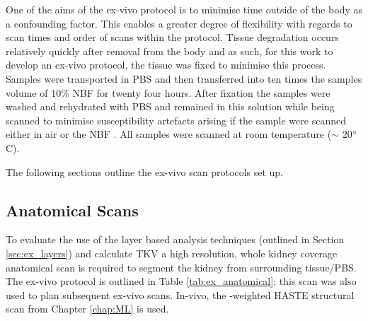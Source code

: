 One of the aims of the ex-vivo protocol is to minimise time outside of the body as a confounding factor. This enables a greater degree of flexibility with regards to scan times and order of scans within the protocol. Tissue degradation occurs relatively quickly after removal from the body and as such, for this work to develop an ex-vivo protocol, the tissue was fixed to minimise this process. Samples were transported in \acf{PBS} and then transferred into ten times the samples volume of 10\% \acf{NBF} for twenty four hours. After fixation the samples were washed and rehydrated with \ac{PBS} and remained in this solution while being scanned to minimise susceptibility artefacts arising if the sample were scanned either in air or the \ac{NBF} \cite{sengupta_high_2017}. All samples were scanned at room temperature ($\sim$ 20$\degree$C).


The following sections outline the ex-vivo scan protocols set up.
\subsection{Anatomical Scans}
\label{subsec:ex_anatomical_scans}
To evaluate the use of the layer based analysis techniques (outlined in Section \ref{sec:ex_layers}) and calculate \ac{TKV} a high resolution, whole kidney coverage anatomical scan is required to segment the kidney from surrounding tissue/\ac{PBS}. The ex-vivo protocol is outlined in Table \ref{tab:ex_anatomical}; this scan was also used to plan subsequent ex-vivo scans. In-vivo, the \ttwo-weighted \ac{HASTE} structural scan from Chapter \ref{chap:ML} is used.

